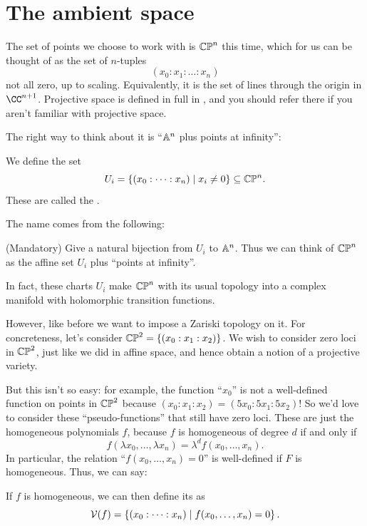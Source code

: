 \documentclass[11pt]{scrreprt}
\begin{document}
\section{The ambient space}
The set of points we choose to work with is $\mathbb{CP}^n$ this time,
which for us can be thought of as the set of $n$-tuples
\[ \left( x_0 : x_1 : \dots : x_n \right) \]
not all zero, up to scaling.
Equivalently, it is the set of lines through the origin in $\CC^{n+1}$.
Projective space is defined in full in ,
and you should refer there if you aren't familiar with projective space.

The right way to think about it is ``$\mathbb A^n$ plus points at infinity'':
\begin{definition}
	We define the set
	\[ U_i = \left\{ (x_0 : \dots : x_n) \mid x_i \neq 0  \right\}
		\subseteq \mathbb{CP}^n. \]
	These are called the .
\end{definition}
The name comes from the following:
\begin{exercise}
	(Mandatory)
	Give a natural bijection from $U_i$ to $\mathbb A^n$.
	Thus we can think of $\mathbb{CP}^n$ as the affine set $U_i$
	plus ``points at infinity''.
\end{exercise}
\begin{remark}
	In fact, these charts $U_i$ make $\mathbb{CP}^n$ with its usual topology
	into a complex manifold with holomorphic transition functions.
\end{remark}

However, like before we want to impose a Zariski topology on it.
For concreteness, let's consider $\mathbb{CP}^2 = \left\{ (x_0 : x_1 : x_2) \right\}$.
We wish to consider zero loci in $\mathbb{CP}^2$, just like we did in affine space,
and hence obtain a notion of a projective variety.

But this isn't so easy: for example,
the function ``$x_0$'' is not a well-defined function on points in $\mathbb{CP}^2$ 
because $(x_0 : x_1 : x_2) = (5x_0 : 5x_1 : 5x_2)$!
So we'd love to consider these ``pseudo-functions''
that still have zero loci. These are just the homogeneous polynomials $f$,
because $f$ is homogeneous of degree $d$ if and only if
\[
	f(\lambda x_0, \dots, \lambda x_n)
	= \lambda^d f(x_0, \dots, x_n).
\]
In particular, the relation ``$f(x_0, \dots, x_n) = 0$'' is
well-defined if $F$ is homogeneous. Thus, we can say:
\begin{definition}
	If $f$ is homogeneous, we can then define its  as
	\[
		\mathcal V(f)
		= \left\{ (x_0 : \dots : x_n) \mid f(x_0, \dots, x_n) = 0 \right\}.
	\]
\end{definition}
\end{document}
